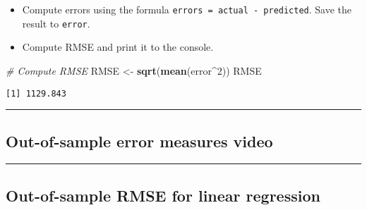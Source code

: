 \documentclass[
]{book}
\newenvironment{Shaded}{\begin{snugshade}}{\end{snugshade}}
\newcommand{\CommentTok}[1]{\textcolor[rgb]{0.56,0.35,0.01}{\textit{#1}}}
\newcommand{\DecValTok}[1]{\textcolor[rgb]{0.00,0.00,0.81}{#1}}
\newcommand{\KeywordTok}[1]{\textcolor[rgb]{0.13,0.29,0.53}{\textbf{#1}}}
\newcommand{\NormalTok}[1]{#1}
\newcommand{\OperatorTok}[1]{\textcolor[rgb]{0.81,0.36,0.00}{\textbf{#1}}}
\newcommand{\StringTok}[1]{\textcolor[rgb]{0.31,0.60,0.02}{#1}}
\providecommand{\tightlist}{%
  \setlength{\itemsep}{0pt}\setlength{\parskip}{0pt}}
\begin{document}
\begin{itemize}
\tightlist
\item
  Compute errors using the formula \texttt{errors\ =\ actual\ -\ predicted}. Save the result to \texttt{error}.
\end{itemize}

\begin{Shaded}
\end{Shaded}

\begin{itemize}
\tightlist
\item
  Compute RMSE and print it to the console.
\end{itemize}

\begin{Shaded}
\begin{Highlighting}[]
\CommentTok{# Compute RMSE}
\NormalTok{RMSE <-}\StringTok{ }\KeywordTok{sqrt}\NormalTok{(}\KeywordTok{mean}\NormalTok{(error}\OperatorTok{^}\DecValTok{2}\NormalTok{))}
\NormalTok{RMSE}
\end{Highlighting}
\end{Shaded}

\begin{verbatim}
[1] 1129.843
\end{verbatim}

\begin{center}\rule{0.5\linewidth}{0.5pt}\end{center}

\hypertarget{out-of-sample-error-measures-video}{%
\subsection*{Out-of-sample error measures video}\label{out-of-sample-error-measures-video}}

\begin{center}\rule{0.5\linewidth}{0.5pt}\end{center}

\hypertarget{out-of-sample-rmse-for-linear-regression}{%
\subsection*{Out-of-sample RMSE for linear regression}\label{out-of-sample-rmse-for-linear-regression}}
\end{document}
